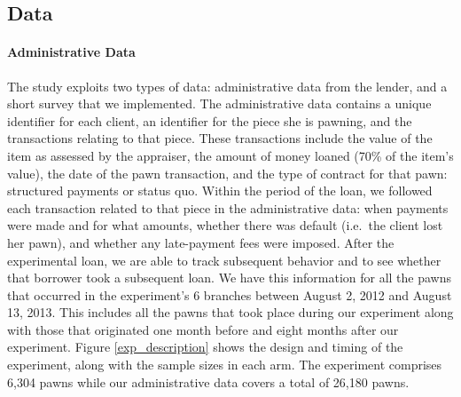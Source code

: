 \documentclass[12pt, a4paper, colorinlistoftodos]{article}
\begin{document}
\subsection{Data}

\paragraph*{Administrative Data}
The study exploits two types of data: administrative data from the lender, and a short survey that we implemented. The administrative data contains a unique identifier for each client, an identifier for the piece she is pawning, and the transactions relating to that piece. These transactions include the value of the item as assessed by the appraiser, the amount of money loaned (70\% of the item's value), the date of the pawn transaction, and the type of contract for that pawn: structured payments or status quo. Within the period of the loan, we followed each transaction related to that piece in the administrative data: when payments were made and for what amounts, whether there was default (i.e.\ the client lost her pawn), and whether any late-payment fees were imposed. After the experimental loan, we are able to track subsequent behavior and to see whether that borrower took a subsequent loan.  We have this information for all the pawns that occurred in the experiment's 6 branches between August 2, 2012 and August 13, 2013. This includes all the pawns that took place during our experiment along with those that originated one month before and eight months after our experiment. Figure \ref{exp_description} shows the design and timing of the experiment, along with the sample sizes in each arm. The experiment comprises 6,304 pawns while our administrative data covers a total of 26,180 pawns.

\end{document}
